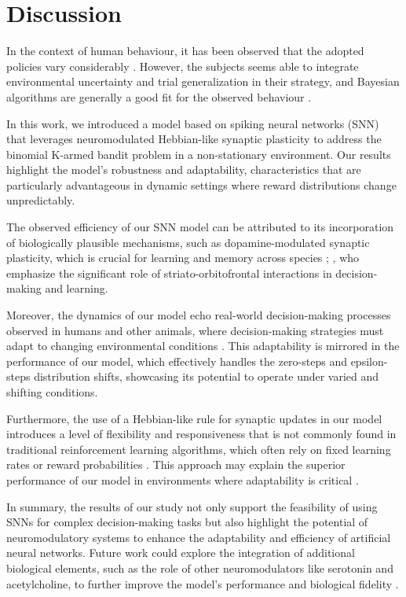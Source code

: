 
\section{Discussion}


In the context of human behaviour, it has been observed that the adopted policies vary considerably \cite{steyversBayesianAnalysisHuman2009a}. However, the subjects seems able to integrate environmental uncertainty and trial generalization in their strategy, and Bayesian algorithms are generally a good fit for the observed behaviour \cite{schulzFindingStructureMultiarmed2020, zhangForgetfulBayesMyopic2013}.


%
In this work, we introduced a model based on spiking neural networks (SNN) that leverages neuromodulated Hebbian-like synaptic plasticity to address the binomial K-armed bandit problem in a non-stationary environment. Our results highlight the model's robustness and adaptability, characteristics that are particularly advantageous in dynamic settings where reward distributions change unpredictably.

The observed efficiency of our SNN model can be attributed to its incorporation of biologically plausible mechanisms, such as dopamine-modulated synaptic plasticity, which is crucial for learning and memory across species \cite{toblerAdaptiveCodingReward2005};
\cite{schulzFindingStructureMultiarmed2020, reynoldsDopaminedependentPlasticityCorticostriatal2002, frankAnatomyDecisionStriatoorbitofrontal2006}, who emphasize the significant role of striato-orbitofrontal interactions in decision-making and learning.

Moreover, the dynamics of our model echo real-world decision-making processes observed in humans and other animals, where decision-making strategies must adapt to changing environmental conditions \cite{nivEvolutionReinforcementLearning2002}. This adaptability is mirrored in the performance of our model, which
effectively handles the zero-steps and epsilon-steps distribution shifts, showcasing its potential to operate under varied and shifting conditions.

Furthermore, the use of a Hebbian-like rule for synaptic updates in our model introduces a level of flexibility and responsiveness that is not commonly found in traditional reinforcement learning algorithms, which often rely on fixed learning rates or reward probabilities
\cite{suttonReinforcementLearningProblem1998}. This approach may explain the superior performance of our model in environments where adaptability is critical \cite{besbesStochasticMultiArmedBanditProblem2014}.

In summary, the results of our study not only support the feasibility of using SNNs for complex decision-making tasks but also highlight the potential of neuromodulatory systems to enhance the adaptability and efficiency of artificial neural networks. Future work could explore the integration of
additional biological elements, such as the role of other neuromodulators like serotonin and acetylcholine, to further improve the model's performance and biological fidelity \cite{coolsChemistryAdaptiveMind2019, dayanDecisionTheoryReinforcement2008}.



